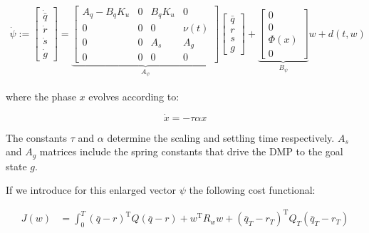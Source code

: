 \documentclass[10pt,a4paper]{article}
\newcommand{\joint}{q} %
\newcommand{\state}{\bar{\joint}} %
\newcommand{\dmp}{s} %
\newcommand{\traj}{r} %
\newcommand{\linDist}{d} %
\newcommand{\fullvec}{\psi} %
\newcommand{\phase}{x} %
\newcommand{\weights}{w} %
\newcommand{\basis}{\Phi} %
\begin{document}
\begin{equation}
\begin{aligned}
 \dot{\fullvec} := 
 \begin{bmatrix}
  \dot{\state} \\
  \dot{\traj} \\
  \dot{\dmp} \\
  \dot{g}
 \end{bmatrix} = 
 \underbrace{\begin{bmatrix}
  A_q - B_qK_u & 0 & B_qK_u & 0 \\
  0 & 0 & 0 & \nu(t) \\
  0  & 0  & A_s & A_g  \\
  0 & 0 & 0 & 0
 \end{bmatrix}}_{A_{\fullvec}}
 \begin{bmatrix}
   \state \\
   \traj \\
   \dmp \\
   g
  \end{bmatrix} +
  \underbrace{\begin{bmatrix}
    0 \\
    0 \\
    \basis(\phase) \\
    0
   \end{bmatrix}}_{B_{\fullvec}} \weights + \linDist(t,\weights)
\end{aligned}
\label{fullTransition}
\end{equation}

where the phase $\phase$ evolves according to:

\begin{equation}
\dot{\phase} = -\tau\alpha\phase
\label{phase}
\end{equation}

The constants $\tau$ and $\alpha$ determine the scaling and settling time respectively. $A_s$ and $A_g$ matrices include the spring constants that drive the DMP to the goal state $g$.

If we introduce for this enlarged vector $\fullvec$ the following cost functional:

\begin{equation}
\begin{aligned}
J(\weights) &= \int_{0}^{T} (\state - \traj)^{\mathrm{T}}Q(\state - \traj) + \weights^{\mathrm{T}}R_w\weights + (\state_T-\traj_T)^{\mathrm{T}}Q_{T}(\state_T-\traj_T) 
\end{aligned}
\label{cost2}
\end{equation}
\end{document}
